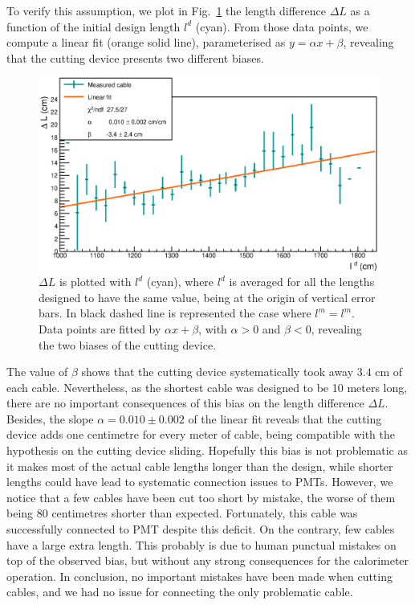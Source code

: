 To verify this assumption, we plot in Fig.~\ref{fig:CutBias} the length difference $\Delta L$ as a function of the initial design length $l^{d}$ (cyan).
From those data points, we compute a linear fit (orange solid line), parameterised as $y = \alpha x + \beta$, revealing that the cutting device presents two different biases.
\begin{figure}[h]
  \centering
  \includegraphics[width=15cm]{commissioning/fig_commissioning/cut_biais.eps}

  \caption{$\Delta L$ is plotted with $l^{d}$ (cyan), where $l^{d}$ is averaged for all the lengths designed to have the same value, being at the origin of vertical error bars.
    In black dashed line is represented the case where $l^{m} = l^{m}$.
    Data points are fitted by $\alpha x + \beta$, with $\alpha > 0$ and $\beta < 0$, revealing the two biases of the cutting device.
    \label{fig:CutBias}}
\end{figure}
The value of $\beta$ shows that the cutting device systematically took away $3.4$ cm of each cable.
Nevertheless, as the shortest cable was designed to be 10 meters long, there are no important consequences of this bias on the length difference $\Delta L$.
Besides, the slope $\alpha = 0.010\pm 0.002$ of the linear fit reveals that the cutting device adds one centimetre for every meter of cable, being compatible with the hypothesis on the cutting device sliding.
Hopefully this bias is not problematic as it makes most of the actual cable lengths longer than the design, while shorter lengths could have lead to systematic connection issues to PMTs.
However, we notice that a few cables have been cut too short by mistake, the worse of them being $80$ centimetres shorter than expected.
Fortunately, this cable  was successfully connected to PMT despite this deficit.
On the contrary, few cables have a large extra length.
This probably is due to human punctual mistakes on top of the observed bias, but without any strong consequences for the calorimeter operation.
In conclusion, no important mistakes have been made when cutting cables, and we had no issue for connecting the only problematic cable.

